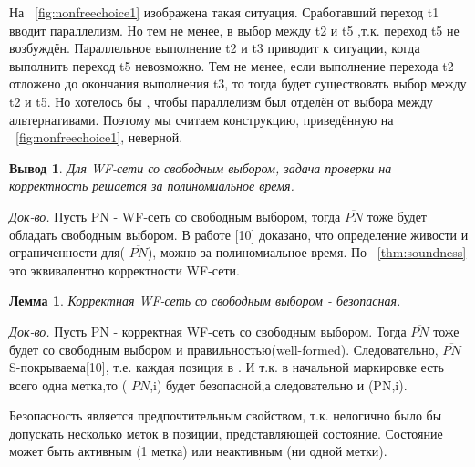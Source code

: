 \documentclass[a4paper,12pt]{article}
\newtheorem{lemma}{Лемма}
\newtheorem{corollary}{Вывод}
\begin{document}
На ~\cref{fig:nonfreechoice1} изображена такая ситуация. Сработавший переход t1 вводит параллелизм. Но тем не менее, в выбор между t2 и t5 ,т.к. переход t5 не возбуждён. Параллельное выполнение t2 и t3 приводит к ситуации, когда выполнить переход t5 невозможно. Тем не менее, если выполнение перехода t2 отложено до окончания выполнения t3, то тогда будет существовать выбор между t2 и t5. Но хотелось бы , чтобы параллелизм был отделён от выбора между альтернативами. Поэтому мы считаем конструкцию, приведённую на ~\cref{fig:nonfreechoice1}, неверной.



\begin{corollary}\label{crl:freechoicesoundness}
Для WF-сети со свободным выбором, задача проверки на корректность решается за полиномиальное время. 
\end{corollary}
\textit{Док-во.} Пусть PN - WF-сеть со свободным выбором, тогда $\overline{PN}$ тоже будет обладать  свободным выбором.  В работе [10] доказано, что определение живости и ограниченности для( $\overline{PN}$), можно за полиномиальное время. По ~\cref{thm:soundness} это эквивалентно корректности WF-сети.


\begin{lemma}
Корректная WF-сеть со свободным выбором - безопасная.
\end{lemma}
\textit{Док-во.} Пусть PN - корректная WF-сеть со свободным выбором. Тогда $\overline{PN}$ тоже будет со свободным выбором и правильностью(well-formed). Следовательно, $\overline{PN}$ S-покрываема[10], т.е. каждая позиция в . И т.к. в начальной маркировке есть всего одна метка,то ( $\overline{PN}$,i) будет безопасной,а следовательно и (PN,i).



Безопасность является предпочтительным свойством, т.к. нелогично было бы допускать несколько меток в позиции, представляющей состояние. Состояние может быть активным (1 метка) или неактивным (ни одной метки). 
\end{document}
